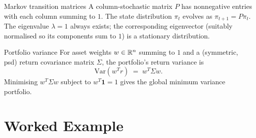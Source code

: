 \begin{rulebox}{Markov transition matrices}
A column-stochastic matrix $P$ has nonnegative entries with each column
summing to $1$. The state distribution $\pi_{t}$ evolves as
$\pi_{t + 1} = P \pi_{t}$. The eigenvalue $\lambda = 1$ always exists; the
corresponding eigenvector (suitably normalised so its components sum to $1$)
is a stationary distribution.
\end{rulebox}

\begin{rulebox}{Portfolio variance}
For asset weights $w \in \mathbb{R}^{n}$ summing to $1$ and a (symmetric, psd)
return covariance matrix $\Sigma$, the portfolio's return variance is
\[
\mathrm{Var}(w^{T} r) \;=\; w^{T} \Sigma w.
\]
Minimising $w^{T} \Sigma w$ subject to $w^{T} \mathbf{1} = 1$ gives the
global minimum variance portfolio.
\end{rulebox}

\section{Worked Example}

